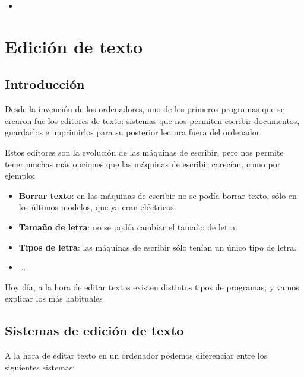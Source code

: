 \begin{itemize}
    \item
\end{itemize}


\chapter{Edición de texto}

\section{Introducción}
Desde la invención de los ordenadores, uno de los primeros programas que se crearon fue los editores de texto: sistemas que nos permiten escribir documentos, guardarlos e imprimirlos para su posterior lectura fuera del ordenador.

Estos editores son la evolución de las máquinas de escribir, pero nos permite tener muchas más opciones que las máquinas de escribir carecían, como por ejemplo:

\begin{itemize}
    \item \textbf{Borrar texto}: en las máquinas de escribir no se podía borrar texto, sólo en los últimos modelos, que ya eran eléctricos.
    \item \textbf{Tamaño de letra}: no se podía cambiar el tamaño de letra.
    \item \textbf{Tipos de letra}: las máquinas de escribir sólo tenían un único tipo de letra.
    \item ...
\end{itemize}

Hoy día, a la hora de editar textos existen distintos tipos de programas, y vamos explicar los más habituales

\section{Sistemas de edición de texto}
A la hora de editar texto en un ordenador podemos diferenciar entre los siguientes sistemas:

